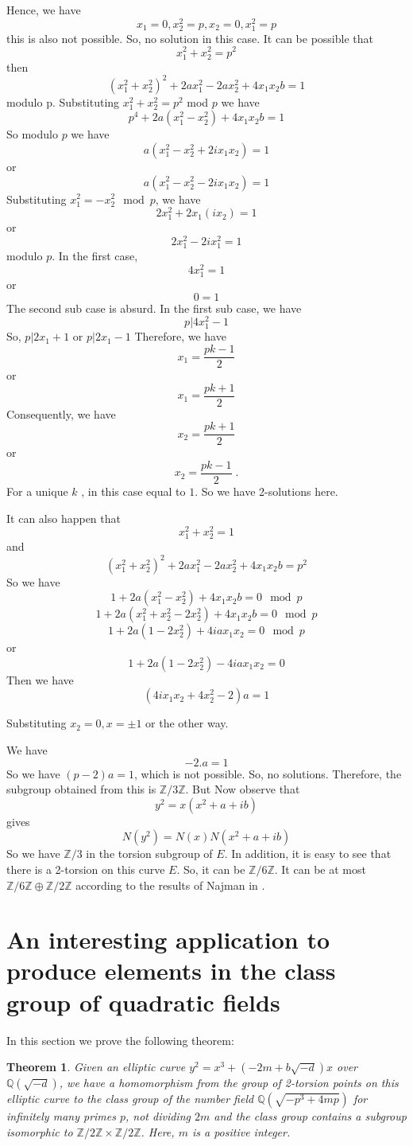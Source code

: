 \documentclass[12pt,leqno]{amsart}
\newcommand{\<}{\langle}
\renewcommand{\>}{\rangle}
\newtheorem{theorem}{Theorem}
\theoremstyle{definition}
\numberwithin{equation}{section}
\begin{document}
Hence, we have
$$x_1=0, x_2^2=p, x_2=0, x_1^2=p$$
this is also not possible.
So, no solution in this case.
It can be possible that $$x_1^2+x_2^2=p^2$$
then
$$(x_1^2+x_2^2)^2+2ax_1^2-2ax_2^2+4x_1x_2b=1$$
modulo p.
Substituting $x_1^2+x_2^2=p^2$ mod $p$ we have
$$p^4+2a(x_1^2-x_2^2)+4x_1x_2b=1$$
So modulo $p$ we have 
$$a(x_1^2-x_2^2+2ix_1x_2)=1$$
or
$$a(x_1^2-x_2^2-2ix_1x_2)=1$$
Substituting $x_1^2=-x_2^2 \mod p$, we have 
$$2x_1^2+2x_1(ix_2)=1$$
or $$2x_1^2-2ix_1^2=1$$
modulo $p$.
In the first  case,
$$4x_1^2=1$$
or 
$$0=1$$
The second sub case is absurd.
In the first sub case, we have 
$$p|4x_1^2-1$$
So, $p|2x_1+1$ or $p|2x_1-1$
Therefore, we have 
$$x_1=\frac{pk-1}{2}$$
or $$x_1=\frac{pk+1}{2}$$
Consequently, we have 
$$x_2=\frac{pk+1}{2}$$
or 
$$x_2=\frac{pk-1}{2}\;.$$
For a unique $k$ , in this case equal to $1$. So we have 2-solutions here.




 It can also happen that 
$$x_1^2+x_2^2=1$$
and
$$(x_1^2+x_2^2)^2+2ax_1^2-2ax_2^2+4x_1x_2b=p^2$$
So we have 
$$1+2a(x_1^2-x_2^2)+4x_1x_2b=0 \mod p$$
$$1+2a(x_1^2+x_2^2-2x_2^2)+4x_1x_2b=0 \mod p$$
$$1+2a(1-2x_2^2)+4iax_1x_2=0 \mod p$$
or 
$$1+2a(1-2x_2^2)-4iax_1x_2=0$$
Then we have 
$$(4ix_1x_2+4x_2^2-2)a=1$$

Substituting $x_2=0,x=\pm{1}$ or the other way.

We have
$$-2.a=1$$
So we have $(p-2)a=1$, which is not possible. So, no solutions. Therefore, the subgroup obtained from this is $\mathbb Z/3\mathbb Z$.
 But Now observe that 
$$y^2=x(x^2+a+ib)$$
gives 
$$N(y^2)=N(x)N(x^2+a+ib)$$
So we have $\mathbb Z/3$ in the torsion subgroup of $E$. In addition, it is easy to see that there is a 2-torsion on this curve $E$. So, it can be $\mathbb{Z}/6\mathbb Z$. It can be at most $\mathbb Z/6\mathbb Z\oplus \mathbb Z/2\mathbb Z$ according to the results of Najman in \cite{N}.


\section{An interesting application to produce elements in the class group of quadratic fields}

In this section we prove the following theorem:

\begin{theorem}
Given an elliptic curve $y^2=x^3+(-2m+b\sqrt{-d})x$ over $\mathbb Q(\sqrt{-d})$, we have a homomorphism from the group of 2-torsion points on this elliptic curve to the class group of the number field $\mathbb Q(\sqrt{-p^3+4mp})$ for infinitely many primes $p$, not dividing $2m$ and the class group contains a subgroup isomorphic to $\mathbb Z/2\mathbb Z\times \mathbb Z/2\mathbb Z$. Here, $m$ is a positive integer.
\end{theorem}
\end{document}
